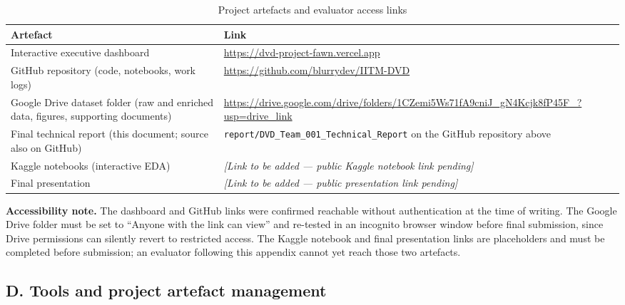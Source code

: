 \documentclass[11pt,a4paper]{article}
\begin{document}
\begin{table}[h]
\centering
\caption{Project artefacts and evaluator access links}
\begin{tabularx}{\textwidth}{L{3.6cm} L{9.9cm}}
\toprule
\textbf{Artefact} & \textbf{Link} \\
\midrule
Interactive executive dashboard &
\url{https://dvd-project-fawn.vercel.app} \\[4pt]
GitHub repository (code, notebooks, work logs) &
\url{https://github.com/blurrydev/IITM-DVD} \\[4pt]
Google Drive dataset folder (raw and enriched data, figures, supporting documents) &
\url{https://drive.google.com/drive/folders/1CZemi5Ws71fA9cniJ_gN4Kcjk8fP45F_?usp=drive_link} \\[4pt]
Final technical report (this document; source also on GitHub) &
\texttt{report/DVD\_Team\_001\_Technical\_Report} on the GitHub repository above \\[4pt]
Kaggle notebooks (interactive EDA) &
\textit{[Link to be added --- public Kaggle notebook link pending]} \\[4pt]
Final presentation &
\textit{[Link to be added --- public presentation link pending]} \\
\bottomrule
\end{tabularx}
\end{table}

\textbf{Accessibility note.} The dashboard and GitHub links were confirmed reachable without authentication at the time of writing. The Google Drive folder must be set to ``Anyone with the link can view'' and re-tested in an incognito browser window before final submission, since Drive permissions can silently revert to restricted access. The Kaggle notebook and final presentation links are placeholders and must be completed before submission; an evaluator following this appendix cannot yet reach those two artefacts.

\subsection*{D. Tools and project artefact management}
\end{document}
